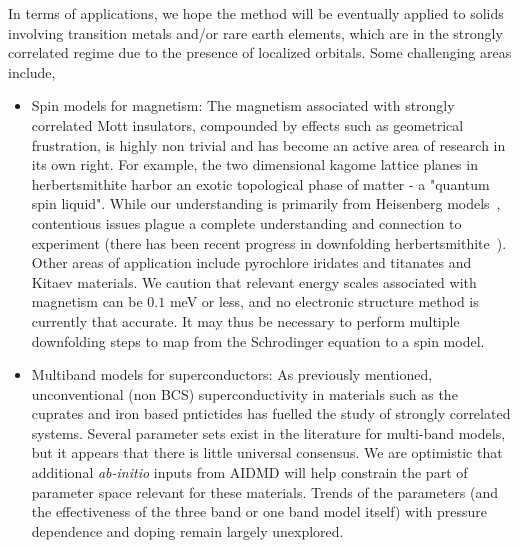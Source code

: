 \documentclass[prl,12pt,onecolumn,nofootinbib,notitlepage,english,superscriptaddress]{revtex4-1}
\newcommand{\HJC}[1]{{\color{RED}{\bf HJC: #1}}}
\begin{document}
In terms of applications, we hope the method will be eventually applied to solids involving transition 
metals and/or rare earth elements, which are in the strongly correlated regime due to the presence of localized orbitals. 
Some challenging areas include,
\begin{itemize} 
	\item Spin models for magnetism: 
	The magnetism associated with strongly correlated Mott insulators, compounded by effects such as geometrical frustration, 
	is highly non trivial and has become an active area of research in its own right. 
	For example, the two dimensional kagome lattice planes in 
	herbertsmithite harbor an exotic topological phase of matter - a "quantum spin liquid". While our understanding is primarily 
	from Heisenberg models~\cite{Yan_Huse_White, Hermele_Wen, Iqbal_Becca, Changlani_motherkagome}, 
	contentious issues plague a complete understanding and connection to experiment (there has been recent progress 
	in downfolding herbertsmithite~\cite{Jeschke}). 
	Other areas of application include pyrochlore iridates and titanates and Kitaev materials. 
	We caution that relevant energy scales associated with magnetism can be $0.1$ meV or less, and no electronic structure 
	method is currently that accurate. It may thus be necessary to perform multiple downfolding steps to map from 
	the Schrodinger equation to a spin model.
	\item Multiband models for superconductors:
	As previously mentioned, unconventional (non BCS) superconductivity in materials such as the cuprates and iron based 
	pntictides has fuelled the study of strongly correlated systems.
	Several parameter sets exist in the literature for multi-band models, but it appears that there is little universal consensus. 
	We are optimistic that additional \emph{ab-initio} inputs from AIDMD will help constrain the part of parameter 
	space relevant for these materials. Trends of the parameters (and the effectiveness of the three band 
	or one band model itself) with pressure dependence and doping remain largely unexplored.  
\end{itemize} 




\end{document}
